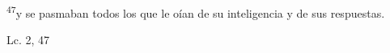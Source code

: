 \documentclass[../../rosario.tex]{subfiles}
\begin{document}
    \textsuperscript{47}y se pasmaban todos los que le oían de su inteligencia y de sus respuestas.
    \begin{flushright}
    Lc. 2, 47     
    \end{flushright}
\end{document}
